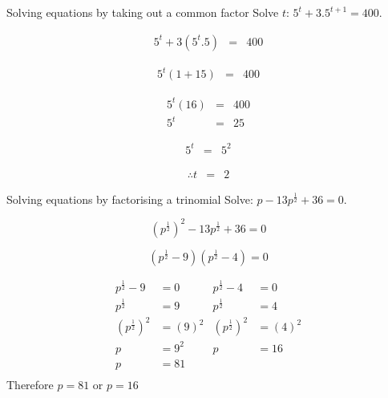 \begin{wex}
{%
Solving equations by taking out a common factor
}
{%
Solve $t$: 
$ 5^t + 3 . 5^{t+1} = 400. $
}
{%

\begin{eqnarray*}
 5^t + 3 ( 5^t . 5) & = & 400 
\end{eqnarray*}

\begin{eqnarray*}
 5^t(1 + 15) & = & 400 
\end{eqnarray*}



\begin{eqnarray*}
 5^t(16) & = & 400 \\
  5^t & = & 25 
\end{eqnarray*}


\begin{eqnarray*}
  5^t & = & 5^2 
\end{eqnarray*}


\begin{eqnarray*}
\therefore t & = & 2
\end{eqnarray*}

}
\end{wex}

\begin{wex}
{%
Solving equations by factorising a trinomial
}
{%
Solve: $ p-13 p^{\frac{1}{2}} + 36 =  0.$
}
{ %


$$ (p^{\frac{1}{2}})^2 -13p^{\frac{1}{2}} + 36 = 0 $$


$$ (p^{\frac{1}{2}} -9)(p^{\frac{1}{2}}-4) = 0 $$


\begin{align*}
p^{\frac{1}{2}} - 9 &= 0			&   p^{\frac{1}{2}} - 4 &= 0		\\
p^{\frac{1}{2}} &= 9				&   p^{\frac{1}{2}} &= 4		\\		
(p^{\frac{1}{2}})^2 &= (9)^2			&   (p^{\frac{1}{2}})^2 &= (4)^2\\
p &= 9^2				&   p &= 16\\
p &= 81					&\\
\end{align*} 
Therefore $p=81$ or $p=16$


}
\end{wex}

